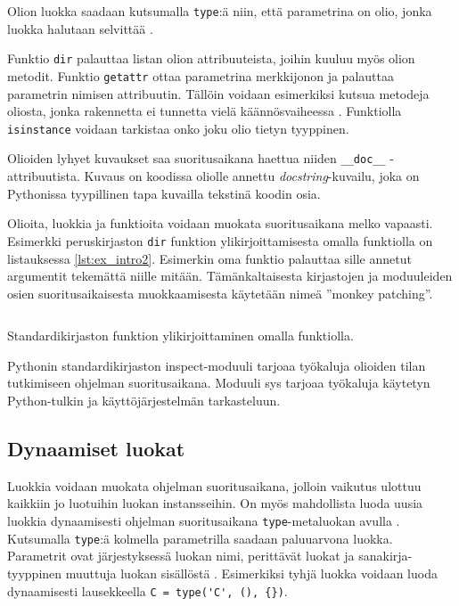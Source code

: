 \documentclass[finnish]{tktltiki2}
\theoremstyle{definition}
\theoremstyle{remark}
\begin{document}
Olion luokka saadaan kutsumalla \verb|type|:ä niin, että parametrina on olio, jonka luokka halutaan selvittää \cite{dive-into-python}. 

Funktio \verb|dir| palauttaa listan olion attribuuteista, joihin kuuluu myös olion metodit. Funktio \verb|getattr| ottaa parametrina merkkijonon ja palauttaa parametrin nimisen attribuutin. Tällöin voidaan esimerkiksi kutsua metodeja oliosta, jonka rakennetta ei tunnetta vielä käännösvaiheessa \cite{dive-into-python}. Funktiolla \verb|isinstance| voidaan tarkistaa onko joku olio tietyn tyyppinen. 

Olioiden lyhyet kuvaukset saa suoritusaikana haettua niiden \verb|__doc__| -attribuutista. Kuvaus on koodissa oliolle annettu \emph{docstring}-kuvailu, joka on Pythonissa tyypillinen tapa kuvailla tekstinä koodin osia.

Olioita, luokkia ja funktioita voidaan muokata suoritusaikana melko vapaasti. Esimerkki peruskirjaston \verb|dir| funktion ylikirjoittamisesta omalla funktiolla on listauksessa \ref{lst:ex_intro2}. Esimerkin oma funktio palauttaa sille annetut argumentit tekemättä niille mitään. Tämänkaltaisesta kirjastojen ja moduuleiden osien suoritusaikaisesta muokkaamisesta käytetään nimeä ''monkey patching''.

\begin{listing}
    \inputminted[linenos]{python}{code/introspektio2.py}
    \caption{Standardikirjaston funktion ylikirjoittaminen omalla funktiolla.}
    \label{lst:ex_intro2}
\end{listing}

Pythonin standardikirjaston inspect-moduuli tarjoaa työkaluja olioiden tilan tutkimiseen ohjelman suoritusaikana. Moduuli sys tarjoaa työkaluja käytetyn Python-tulkin ja käyttöjärjestelmän tarkasteluun.

\subsection{Dynaamiset luokat}

Luokkia voidaan muokata ohjelman suoritusaikana, jolloin vaikutus ulottuu kaikkiin jo luotuihin luokan instansseihin. On myös mahdollista luoda uusia luokkia dynaamisesti ohjelman suoritusaikana \verb|type|-metaluokan avulla \cite{MetaprogP3}. Kutsumalla \verb|type|:ä kolmella parametrilla saadaan paluuarvona luokka. Parametrit ovat järjestyksessä luokan nimi, perittävät luokat ja sanakirja-tyyppinen muuttuja luokan sisällöstä \cite{MetaprogP3}. Esimerkiksi tyhjä luokka voidaan luoda dynaamisesti lausekkeella \verb|C = type('C', (), {})|.
\end{document}
